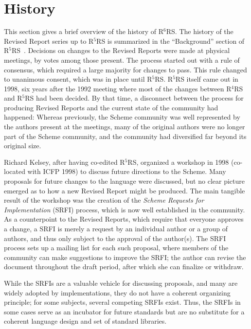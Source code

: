 \documentclass{acm_proc_article-sp}
\newcommand{\rn}[1]{R$^{#1}$RS}
\begin{document}
\section{History}
\label{sec:history}

This section gives a brief overview of the history of \rn{6}.  The
history of the Revised Report series up to \rn{5} is summarized in the
``Background'' section of \rn{5}~\cite{R5RS}.  Decisions on changes to
the Revised Reports were made at physical meetings, by votes among
those present.  The process started out with a rule of consensus, which
required a large majority for changes to pass.  This rule changed to
unanimous consent, which was in place until \rn{5}.  \rn{5} itself
came out in 1998, six years after the 1992 meeting where most of the
changes between \rn{4} and \rn{5} had been decided.  By that time, a
disconnect between the process for producing Revised Reports and the
current state of the community had happened: Whereas previously, the
Scheme community was well represented by the authors present at the
meetings, many of the original authors were no longer part of the
Scheme community, and the community had diversified far beyond its
original size.

Richard Kelsey, after having co-edited \rn{5}, organized a workshop in
1998 (co-located with ICFP 1998) to discuss future directions to the
Scheme.  Many proposals for future changes to the language were
discussed, but no clear picture emerged as to how a new Revised Report
might be produced. The main tangible result of the workshop was the
creation of the \textit{Scheme Requests for Implementation} (SRFI)
process, which is now well established in the community.  As a
counterpoint to the Revised Reports, which require that everyone
approves a change, a SRFI is merely a request by an individual author
or a group of authors, and thus only subject to the approval of the
author(s).  The SRFI process sets up a mailing list for each such
proposal, where members of the community can make suggestions to
improve the SRFI; the author can revise the document throughout the
draft period, after which she can finalize or withdraw.

While the SRFIs are a valuable vehicle for discussing proposals, and
many are widely adopted by implementations, they do not have a
coherent organizing principle; for some subjects, several competing
SRFIs exist.  Thus, the SRFIs in some cases serve as an incubator for
future standards but are no substitute for a coherent
language design and set of standard libraries.
\end{document}
